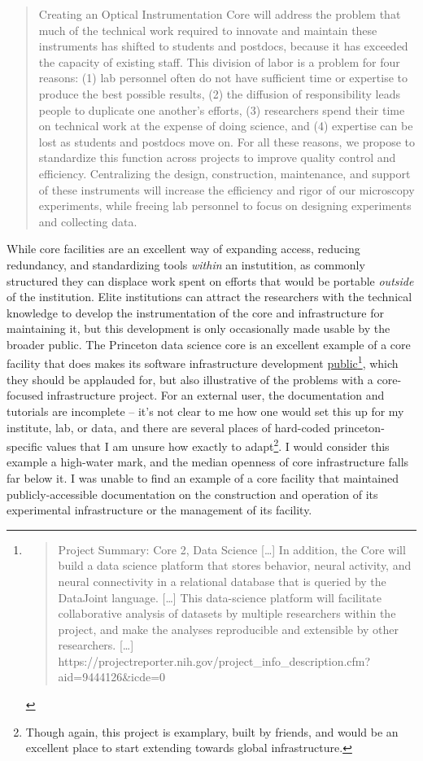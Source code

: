 \begin{quote}
Creating an Optical Instrumentation Core will address the problem that
much of the technical work required to innovate and maintain these
instruments has shifted to students and postdocs, because it has
exceeded the capacity of existing staff. This division of labor is a
problem for four reasons: (1) lab personnel often do not have sufficient
time or expertise to produce the best possible results, (2) the
diffusion of responsibility leads people to duplicate one another's
efforts, (3) researchers spend their time on technical work at the
expense of doing science, and (4) expertise can be lost as students and
postdocs move on. For all these reasons, we propose to standardize this
function across projects to improve quality control and efficiency.
Centralizing the design, construction, maintenance, and support of these
instruments will increase the efficiency and rigor of our microscopy
experiments, while freeing lab personnel to focus on designing
experiments and collecting data.
\end{quote}

While core facilities are an excellent way of expanding access, reducing
redundancy, and standardizing tools \emph{within} an instutition, as
commonly structured they can displace work spent on efforts that would
be portable \emph{outside} of the institution. Elite institutions can
attract the researchers with the technical knowledge to develop the
instrumentation of the core and infrastructure for maintaining it, but
this development is only occasionally made usable by the broader public.
The Princeton data science core is an excellent example of a core
facility that does makes its software infrastructure development
\href{https://github.com/BrainCOGS}{public}\footnote{\begin{quote}
  Project Summary: Core 2, Data Science {[}\ldots{]} In addition, the
  Core will build a data science platform that stores behavior, neural
  activity, and neural connectivity in a relational database that is
  queried by the DataJoint language. {[}\ldots{]} This data-science
  platform will facilitate collaborative analysis of datasets by
  multiple researchers within the project, and make the analyses
  reproducible and extensible by other researchers. {[}\ldots{]}
  https://projectreporter.nih.gov/project\_info\_description.cfm?aid=9444126\&icde=0
  \end{quote}}, which they should be applauded for, but also
illustrative of the problems with a core-focused infrastructure project.
For an external user, the documentation and tutorials are incomplete --
it's not clear to me how one would set this up for my institute, lab, or
data, and there are several places of hard-coded princeton-specific
values that I am unsure how exactly to adapt\footnote{Though again, this
  project is examplary, built by friends, and would be an excellent
  place to start extending towards global infrastructure.}. I would
consider this example a high-water mark, and the median openness of core
infrastructure falls far below it. I was unable to find an example of a
core facility that maintained publicly-accessible documentation on the
construction and operation of its experimental infrastructure or the
management of its facility.

